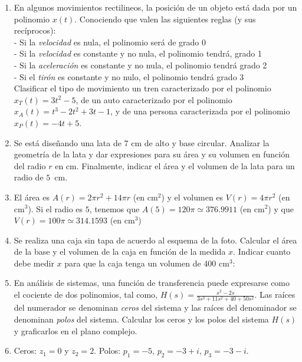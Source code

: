 \documentclass[a4paper]{article}
\newcommand{\answer}{\item[**]}
\newcommand{\df}[2]{\displaystyle\frac{#1}{#2}}
\newcommand{\img}[2]{ \begin{minipage}[t]{\linewidth} \raisebox{-\height}{\texttt{[image: \#2]}} \end{minipage} }
\begin{document}
\begin{enumerate}
\begin{enumerate} [label=(\alph*)]
		\item En algunos movimientos rectilineos, la posición de un objeto está dada por un polinomio $x(t)$. Conociendo que valen las siguientes reglas (y sus recíprocos): \\ - Si la \textit{velocidad} es nula, el polinomio será de grado 0 \\ - Si la \textit{velocidad} es constante y no nula, el polinomio tendrá, grado 1 \\ - Si la \textit{aceleración} es constante y no nula, el polinomio tendrá grado 2 \\ - Si el \textit{tirón} es constante y no nulo, el polinomio tendrá grado 3 \\ Clasificar el tipo de movimiento un tren caracterizado por el polinomio $x_T(t)=3t^2-5$, de un auto caracterizado por el polinomio $x_A(t)=t^3-2t^2+3t-1$, y de una persona caracterizada por el polinomio $x_P(t)=-4t+5$.

		\item Se está diseñando una lata de 7 cm de alto y base circular. Analizar la geometría de la lata y dar expresiones para su área y su volumen en función del radio $r$ en cm. Finalmente, indicar el área y el volumen de la lata para un radio de $5$~cm.
		\answer El área es $A(r)=2 \pi r^2+ 14 \pi r$ (en cm$^2$) y el volumen es $V(r)=4 \pi r^2$ (en cm$^3$). Si el radio es $5$, tenemos que $A(5)=120\pi \simeq 376.9911$ (en cm$^2$) y que $V(r)=100\pi \simeq 314.1593$ (en cm$^3$)

		\item Se realiza una caja sin tapa de acuerdo al esquema de la foto. Calcular el área de la base y el volumen de la caja en función de la medida $x$. Indicar cuanto debe medir $x$ para que la caja tenga un volumen de 400 cm$^3$: \img{0.5\textwidth}{img/box.png} 

		\item En análisis de sistemas, una función de transferencia puede expresarse como el cociente de dos polinomios, tal como, $H(s)=\df{s^2-2s}{3s^3+11s^2+40+50s^2}$. Las raíces del numerador se denominan \textit{ceros} del sistema y las raíces del denominador se denominan \textit{polos} del sistema. Calcular los ceros y los polos del sistema $H(s)$ y graficarlos en el plano complejo.
		\answer Ceros: $z_1=0$ y $z_2=2$. Polos: $p_1=-5$, $p_2=-3+i$, $p_3=-3-i$.


\end{enumerate}
\end{enumerate}
\end{document}
